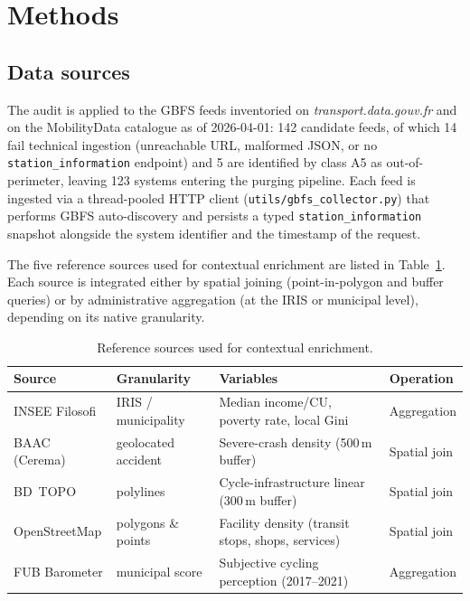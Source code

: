 \documentclass[11pt,a4paper]{article}
\begin{document}
\section{Methods}\label{secMethods}

\subsection{Data sources}
The audit is applied to the GBFS feeds inventoried on
\emph{transport.data.gouv.fr} and on the MobilityData catalogue as of
2026-04-01: 142 candidate feeds, of which 14 fail technical ingestion
(unreachable URL, malformed JSON, or no \texttt{station\_information}
endpoint) and 5 are identified by class A5 as out-of-perimeter,
leaving 123 systems entering the purging pipeline. Each feed is
ingested via a thread-pooled HTTP client (\texttt{utils/gbfs\_collector.py})
that performs GBFS auto-discovery and persists a typed
\texttt{station\_information} snapshot alongside the system identifier
and the timestamp of the request.

The five reference sources used for contextual enrichment are listed
in Table~\ref{tab:sources}. Each source is integrated either by
spatial joining (point-in-polygon and buffer queries) or by
administrative aggregation (at the IRIS or municipal level),
depending on its native granularity.

\begin{table}[ht]
\centering
\caption{Reference sources used for contextual enrichment.}
\label{tab:sources}
\small
\begin{tabular}{@{}llll@{}}
\toprule
\textbf{Source} & \textbf{Granularity} & \textbf{Variables} & \textbf{Operation}\\
\midrule
INSEE Filosofi & IRIS / municipality &
   Median income/CU, poverty rate, local Gini & Aggregation \\
BAAC (Cerema)  & geolocated accident &
   Severe-crash density (500\,m buffer) & Spatial join \\
BD~TOPO        & polylines &
   Cycle-infrastructure linear (300\,m buffer) & Spatial join \\
OpenStreetMap  & polygons \& points &
   Facility density (transit stops, shops, services) & Spatial join \\
FUB Barometer  & municipal score &
   Subjective cycling perception (2017--2021) & Aggregation \\
\bottomrule
\end{tabular}
\end{table}
\end{document}
